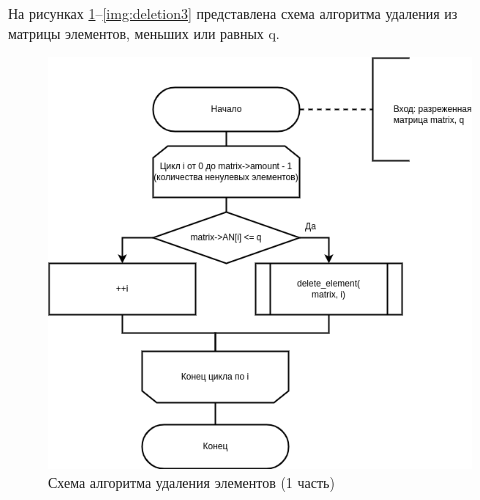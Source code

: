 На рисунках \ref{img:deletion1}--\ref{img:deletion3} представлена схема алгоритма удаления из матрицы элементов, меньших или равных q.

\begin{figure}[H]
	\begin{center}
		\includegraphics[scale=0.51]{img/deletion1.png}
	\end{center}
	\captionsetup{justification=centering}
	\caption{Схема алгоритма удаления элементов (1 часть)}
	\label{img:deletion1}
\end{figure}

